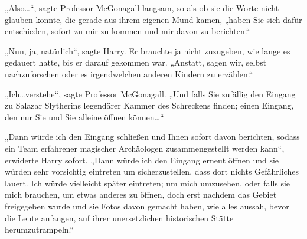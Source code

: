 „Also…“, sagte Professor McGonagall langsam, so als ob sie die Worte nicht glauben konnte, die gerade aus ihrem eigenen Mund kamen, „haben Sie sich dafür entschieden, sofort zu mir zu kommen und mir davon zu berichten.“

„Nun, ja, natürlich“, sagte Harry. Er brauchte ja nicht zuzugeben, wie lange es gedauert hatte, bis er darauf gekommen war. „Anstatt, sagen wir, selbst nachzuforschen oder es irgendwelchen anderen Kindern zu erzählen.“

„Ich…verstehe“, sagte Professor McGonagall. „Und falls Sie zufällig den Eingang zu Salazar Slytherins legendärer Kammer des Schreckens finden; einen Eingang, den nur Sie und Sie alleine öffnen können…“

„Dann würde ich den Eingang schließen und Ihnen sofort davon berichten, sodass ein Team erfahrener magischer Archäologen zusammengestellt werden kann“, erwiderte Harry sofort. „Dann würde ich den Eingang erneut öffnen und sie würden sehr vorsichtig eintreten um sicherzustellen, dass dort nichts Gefährliches lauert. Ich würde vielleicht später eintreten; um mich umzusehen, oder falls sie mich brauchen, um etwas anderes zu öffnen, doch erst nachdem das Gebiet freigegeben wurde und sie Fotos davon gemacht haben, wie alles aussah, bevor die Leute anfangen, auf ihrer unersetzlichen historischen Stätte herumzutrampeln.“



